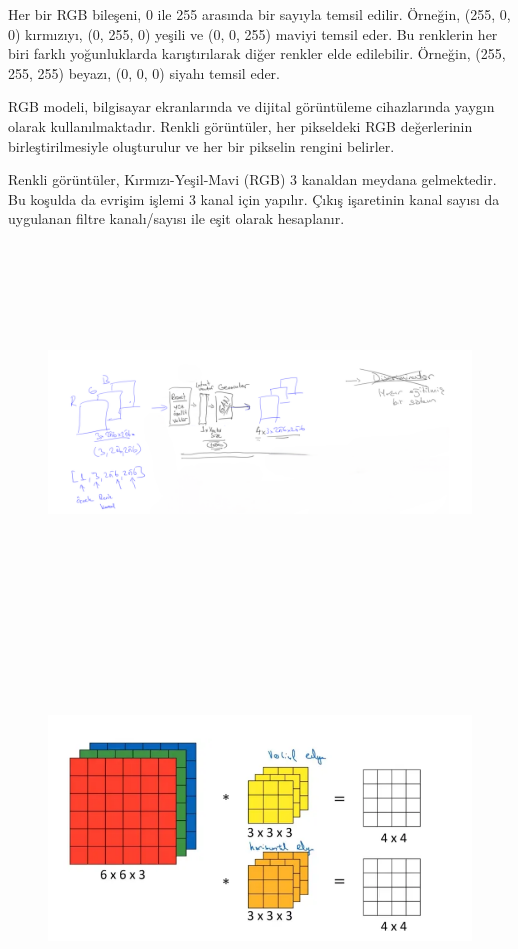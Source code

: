\documentclass[12pt]{article}
\begin{document}
Her bir RGB bileşeni, 0 ile 255 arasında bir sayıyla temsil edilir. Örneğin, (255, 0, 0) kırmızıyı, (0, 255, 0) yeşili ve (0, 0, 255) maviyi temsil eder. Bu renklerin her biri farklı yoğunluklarda karıştırılarak diğer renkler elde edilebilir. Örneğin, (255, 255, 255) beyazı, (0, 0, 0) siyahı temsil eder.\cite{AyyuceKizirak}

RGB modeli, bilgisayar ekranlarında ve dijital görüntüleme cihazlarında yaygın olarak kullanılmaktadır. Renkli görüntüler, her pikseldeki RGB değerlerinin birleştirilmesiyle oluşturulur ve her bir pikselin rengini belirler.

Renkli görüntüler, Kırmızı-Yeşil-Mavi (RGB) 3 kanaldan meydana gelmektedir. Bu koşulda da evrişim işlemi 3 kanal için yapılır. Çıkış işaretinin kanal sayısı da uygulanan filtre kanalı/sayısı ile eşit olarak hesaplanır.
\begin{figure}[h]
    \centering
    \includegraphics[width=7\textwidth, height=10cm, keepaspectratio]{resnet.png}
    \label{fig:enter-label}
\end{figure}
\begin{figure}[h]
    \centering
    \includegraphics[width=7\textwidth, height=10cm, keepaspectratio]{rgb.png}
    \label{fig:enter-label}
\end{figure}
\clearpage
\end{document}
